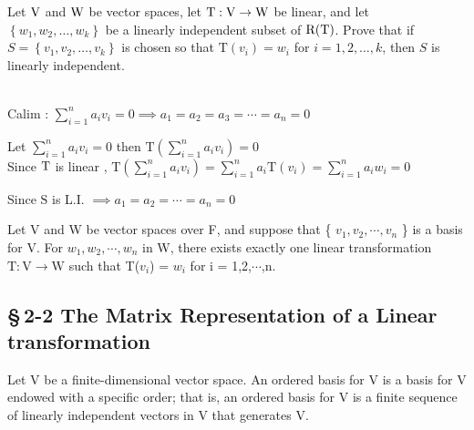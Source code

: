 		\begin{example}
		Let \(\rm V\) and \(\rm W\) be vector spaces, let \(\mathrm{T}:\rm  V \rightarrow W\) be linear, and let
\(\left\{w_{1}, w_{2}, \ldots, w_{k}\right\}\) be a linearly independent subset of \(\rm R(T)\). Prove that
if \(S=\left\{v_{1}, v_{2}, \ldots, v_{k}\right\}\) is chosen so that \(\mathrm{T}\left(v_{i}\right)=w_{i}\) for \(i=1,2, \ldots, k\),
then \(S\) is linearly independent.
\begin{sol*}$ $
$ $\\
Calim : $\sum_{i=1}^n a_iv_i = 0\implies a_1 = a_2 = a_3 =\cdots =a_n = 0 $ 


Let \(\sum_{i=1}^{n} a_{i} v_{i}=0\)
then \(\mathrm{T}\left(\sum_{i=1}^{n} a_{i} v_{i}\right)=0\)
$ $\\
Since \(\rm T\) is linear , \(\mathrm{T}\left(\sum_{i=1}^{n} a_{i} v_{i}\right)=\sum_{i=1}^{n} a_{i} \mathrm{T}\left(v_{i}  \right)=\sum_{i=1}^na_iw_i = 0\)


Since $\mathrm{S}$ is L.I. $\implies a_1 = a_2=\cdots = a_n = 0$ 
\end{sol*}
	

\end{example}
\begin{thm*}[2.6]
$ $ \\Let V and W be vector spaces over F, and suppose that \{ $v_1,v_2,\cdots,v_n$ \} is a basis for V. For $w_1,w_2,\cdots,w_n$ in W, there exists exactly one linear transformation $\mathrm{T}: \mathrm{V}  \rightarrow \mathrm{W}$ such that T($v_i$) = $w_i$ for i = 1,2,$\cdots$,n.
\end{thm*}
		
\subsection*{\S\,2-2 The Matrix Representation of a Linear transformation}

\begin{defn}
$ $ \\  Let V be a finite-dimensional vector space. An ordered basis for V is a basis for V endowed with a specific order; that is, an ordered basis for V is a finite sequence of linearly independent vectors in V that generates V.
\end{defn}

